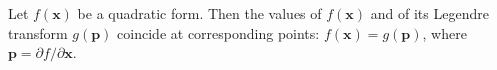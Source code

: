 Let $f(\mathbf{x})$ be a quadratic form. Then the values of $f(\mathbf{x})$ and of its Legendre transform $g(\mathbf{p})$ coincide at corresponding points: $f(\mathbf{x}) = g(\mathbf{p})$, where $\mathbf{p} = \partial f / \partial \mathbf{x}$.